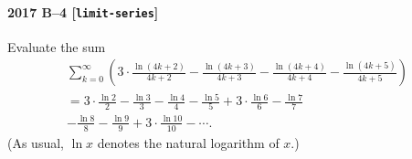 \paragraph{2017 B--4 \textnormal{[\texttt{limit-series}]}}
Evaluate the sum
\begin{gather*}
\sum_{k=0}^\infty \left( 3 \cdot \frac{\ln(4k+2)}{4k+2} - \frac{\ln(4k+3)}{4k+3} - \frac{\ln(4k+4)}{4k+4} - \frac{\ln(4k+5)}{4k+5} \right) \\
= 3 \cdot \frac{\ln 2}{2} - \frac{\ln 3}{3} - \frac{\ln 4}{4} - \frac{\ln 5}{5}
+ 3 \cdot \frac{\ln 6}{6} - \frac{\ln 7}{7} \\ - \frac{\ln 8}{8} - \frac{\ln 9}{9}
+ 3 \cdot \frac{\ln 10}{10} - \cdots .
\end{gather*}
(As usual, $\ln x$ denotes the natural logarithm of $x$.)
